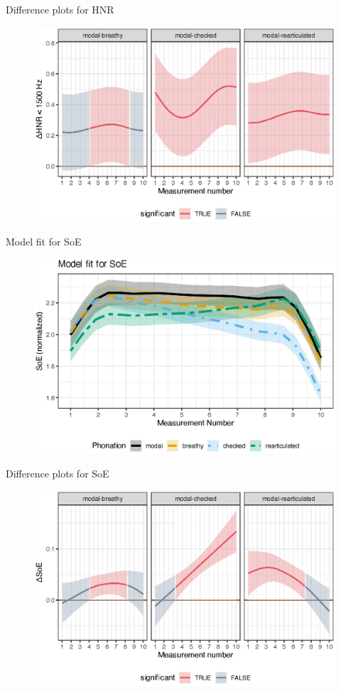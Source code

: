 \documentclass[professionalfonts]{beamer}
\begin{document}
\begin{frame}{Difference plots for HNR}
  \begin{figure}
    \centering
    \includegraphics[width = 0.8\linewidth]{images/LCH_GAMMs/hnr15_model_diff.eps}
  \end{figure}
\end{frame}

\begin{frame}{Model fit for SoE}
  \begin{figure}
    \centering
    \includegraphics[width = 0.8\linewidth]{images/LCH_GAMMs/soe_model_fit.eps}
  \end{figure}
\end{frame}

\begin{frame}{Difference plots for SoE}
  \begin{figure}
    \centering
    \includegraphics[width = 0.8\linewidth]{images/LCH_GAMMs/soe_model_diff.eps}
  \end{figure}
\end{frame}
\end{document}
